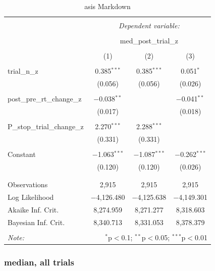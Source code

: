 \documentclass[
]{article}
\begin{document}
\begin{table}[!htbp] \centering 
  \caption{asis Markdown} 
  \label{} 
\begin{tabular}{@{\extracolsep{5pt}}lccc} 
\\[-1.8ex]\hline 
\hline \\[-1.8ex] 
 & \multicolumn{3}{c}{\textit{Dependent variable:}} \\ 
\cline{2-4} 
\\[-1.8ex] & \multicolumn{3}{c}{med\_post\_trial\_z} \\ 
\\[-1.8ex] & (1) & (2) & (3)\\ 
\hline \\[-1.8ex] 
 trial\_n\_z & 0.385$^{***}$ & 0.385$^{***}$ & 0.051$^{*}$ \\ 
  & (0.056) & (0.056) & (0.026) \\ 
  & & & \\ 
 post\_pre\_rt\_change\_z & $-$0.038$^{**}$ &  & $-$0.041$^{**}$ \\ 
  & (0.017) &  & (0.018) \\ 
  & & & \\ 
 P\_stop\_trial\_change\_z & 2.270$^{***}$ & 2.288$^{***}$ &  \\ 
  & (0.331) & (0.331) &  \\ 
  & & & \\ 
 Constant & $-$1.063$^{***}$ & $-$1.087$^{***}$ & $-$0.262$^{***}$ \\ 
  & (0.120) & (0.120) & (0.026) \\ 
  & & & \\ 
\hline \\[-1.8ex] 
Observations & 2,915 & 2,915 & 2,915 \\ 
Log Likelihood & $-$4,126.480 & $-$4,125.638 & $-$4,149.301 \\ 
Akaike Inf. Crit. & 8,274.959 & 8,271.277 & 8,318.603 \\ 
Bayesian Inf. Crit. & 8,340.713 & 8,331.053 & 8,378.379 \\ 
\hline 
\hline \\[-1.8ex] 
\textit{Note:}  & \multicolumn{3}{r}{$^{*}$p$<$0.1; $^{**}$p$<$0.05; $^{***}$p$<$0.01} \\ 
\end{tabular} 
\end{table}

\hypertarget{median-all-trials}{%
\subsubsection{median, all trials}\label{median-all-trials}}
\end{document}
